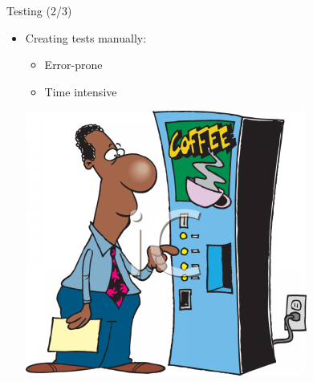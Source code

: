 \documentclass{FMTslides}
\begin{document}
\begin{frame}{Testing (2/3)}
\begin{itemize}
  \item Creating tests manually:
  \begin{itemize}
    \item Error-prone
    \item Time intensive
  \end{itemize}
  \begin{center}
    \includegraphics[scale=0.25]{./figures/guy_at_coffee_machine.jpg}
  \end{center}
\end{itemize}
\end{frame}
\end{document}
